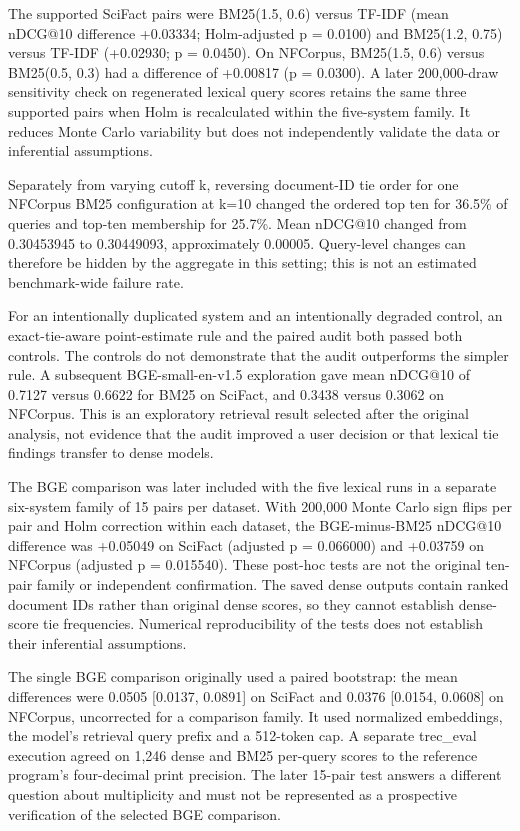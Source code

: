 \documentclass[runningheads]{llncs}
\begin{document}
The supported SciFact pairs were BM25(1.5, 0.6) versus TF-IDF (mean
nDCG@10 difference +0.03334; Holm-adjusted p = 0.0100) and BM25(1.2,
0.75) versus TF-IDF (+0.02930; p = 0.0450). On NFCorpus, BM25(1.5, 0.6)
versus BM25(0.5, 0.3) had a difference of +0.00817 (p = 0.0300). A later
200,000-draw sensitivity check on regenerated lexical query scores
retains the same three supported pairs when Holm is recalculated within
the five-system family. It reduces Monte Carlo variability but does not
independently validate the data or inferential assumptions.

Separately from varying cutoff k, reversing document-ID tie order for
one NFCorpus BM25 configuration at k=10 changed the ordered top ten for
36.5\% of queries and top-ten membership for 25.7\%. Mean nDCG@10
changed from 0.30453945 to 0.30449093, approximately 0.00005.
Query-level changes can therefore be hidden by the aggregate in this
setting; this is not an estimated benchmark-wide failure rate.

For an intentionally duplicated system and an intentionally degraded
control, an exact-tie-aware point-estimate rule and the paired audit
both passed both controls. The controls do not demonstrate that the
audit outperforms the simpler rule. A subsequent BGE-small-en-v1.5
\cite{r11} exploration gave mean nDCG@10 of 0.7127 versus 0.6622 for
BM25 on SciFact, and 0.3438 versus 0.3062 on NFCorpus. This is an
exploratory retrieval result selected after the original analysis, not
evidence that the audit improved a user decision or that lexical tie
findings transfer to dense models.

The BGE comparison was later included with the five lexical runs in a
separate six-system family of 15 pairs per dataset. With 200,000 Monte
Carlo sign flips per pair and Holm correction within each dataset, the
BGE-minus-BM25 nDCG@10 difference was +0.05049 on SciFact (adjusted p =
0.066000) and +0.03759 on NFCorpus (adjusted p = 0.015540). These
post-hoc tests are not the original ten-pair family or independent
confirmation. The saved dense outputs contain ranked document IDs rather
than original dense scores, so they cannot establish dense-score tie
frequencies. Numerical reproducibility of the tests does not establish
their inferential assumptions.

The single BGE comparison originally used a paired bootstrap: the mean
differences were 0.0505 {[}0.0137, 0.0891{]} on SciFact and 0.0376
{[}0.0154, 0.0608{]} on NFCorpus, uncorrected for a comparison family.
It used normalized embeddings, the model's retrieval query prefix and a
512-token cap. A separate trec\_eval execution agreed on 1,246 dense and
BM25 per-query scores to the reference program's four-decimal print
precision. The later 15-pair test answers a different question about
multiplicity and must not be represented as a prospective verification
of the selected BGE comparison.
\end{document}
